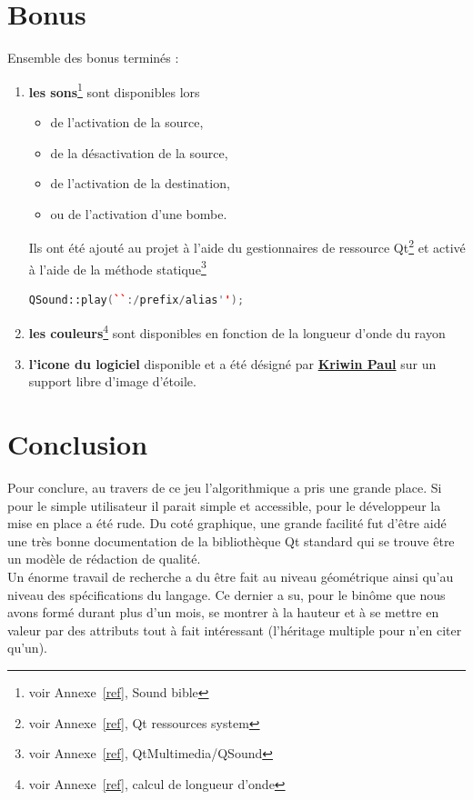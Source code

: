 \documentclass[a4paper,11pt]{report}
\begin{document}
\chapter{Bonus}

Ensemble des bonus terminés :
\begin{enumerate}
	\item \textbf{les sons}\footnote{voir Annexe~\ref{ref}, Sound bible}  sont disponibles lors 
		\begin{itemize}
			\item de l'activation de la source,
			\item de la désactivation de la source,
			\item de l'activation de la destination,
			\item ou de l'activation d'une bombe.
		\end{itemize}
		Ils ont été ajouté au projet à l'aide du gestionnaires de ressource
		Qt\footnote{voir Annexe~\ref{ref}, Qt ressources system} 
		et activé à l'aide de la méthode statique\footnote{voir Annexe~\ref{ref}, QtMultimedia/QSound}
		\begin{lstlisting}[frame=single,language=C++]
	QSound::play(``:/prefix/alias'');
		\end{lstlisting}
	\item \textbf{les couleurs}\footnote{voir Annexe~\ref{ref}, calcul de longueur d'onde} 
		sont disponibles en fonction de la longueur d'onde du rayon
	\item \textbf{l'icone du logiciel} disponible et a été désigné par
		\href{mailto:39171@heb.be}{\textbf{Kriwin Paul}} sur un support libre d'image d'étoile.
\end{enumerate}
\chapter{Conclusion}


\appendix


Pour conclure, au travers de ce jeu l'algorithmique a pris une grande place. Si
pour le simple utilisateur il parait simple et accessible, pour le développeur
la mise en place a été rude. Du coté graphique, une grande facilité fut d'être
aidé une très bonne documentation de la bibliothèque Qt standard qui se trouve
être un modèle de rédaction de qualité. \\

Un énorme travail de recherche a du être fait au niveau géométrique ainsi qu'au 
niveau des spécifications du langage. Ce dernier a su, pour le binôme que nous 
avons formé durant plus d'un mois, se montrer à la hauteur et à se mettre en 
valeur par des attributs tout à fait intéressant (l'héritage multiple pour n'en
citer qu'un). \\
\end{document}
